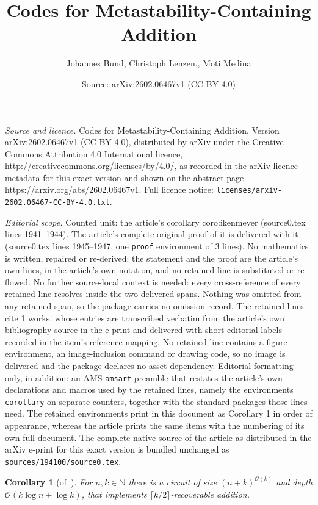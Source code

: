 \documentclass[10pt,a4paper]{amsart}
\title{Codes for Metastability-Containing Addition}
\author{Johannes Bund, Christoph Lenzen,, Moti Medina}
\date{Source: arXiv:2602.06467v1 (CC BY 4.0)}
\newtheorem{corollary}{Corollary}
\newcommand{\BO}{\mathcal{O}}
\newcommand{\IN}{\mathbb{N}}
\newcommand{\ceil}[1]{\lceil{#1}\rceil}
\begin{document}
\maketitle

\noindent\emph{Source and licence.} Codes for Metastability-Containing Addition. Version arXiv:2602.06467v1 (CC BY 4.0), distributed by arXiv under the Creative Commons Attribution 4.0 International licence, http://creativecommons.org/licenses/by/4.0/, as recorded in the arXiv licence metadata for this exact version and shown on the abstract page https://arxiv.org/abs/2602.06467v1. Full licence notice: \texttt{licenses/arxiv-2602.06467-CC-BY-4.0.txt}.\par\smallskip

\noindent\textit{Editorial scope.} Counted unit: the article's corollary coro:ikenmeyer (source0.tex lines 1941--1944). The article's complete original proof of it is delivered with it (source0.tex lines 1945--1947, one \texttt{proof} environment of 3 lines). No mathematics is written, repaired or re-derived: the statement and the proof are the article's own lines, in the article's own notation, and no retained line is substituted or re-flowed.  No further source-local context is needed: every cross-reference of every retained line resolves inside the two delivered spans.  Nothing was omitted from any retained span, so the package carries no omission record.  The retained lines cite 1 works, whose entries are transcribed verbatim from the article's own bibliography source in the e-print and delivered with short editorial labels recorded in the item's reference mapping.  No retained line contains a figure environment, an image-inclusion command or drawing code, so no image is delivered and the package declares no asset dependency.  Editorial formatting only, in addition: an AMS \texttt{amsart} preamble that restates the article's own declarations and macros used by the retained lines, namely the environments \texttt{corollary} on separate counters, together with the standard packages those lines need.  The retained environments print in this document as Corollary 1 in order of appearance, whereas the article prints the same items with the numbering of its own full document.  The complete native source of the article as distributed in the arXiv e-print for this exact version is bundled unchanged as \texttt{sources/194100/source0.tex}.
\begin{corollary}[of~\cite{ikenmeyer18complexity}]\label{coro:ikenmeyer}
  For $n,k\in\IN$ there is a circuit of size $(n+k)^{\BO(k)}$ and depth $\BO(k\log n + \log k)$,
    that implements $\ceil{k/2}$-recoverable addition.
\end{corollary}
\end{document}
